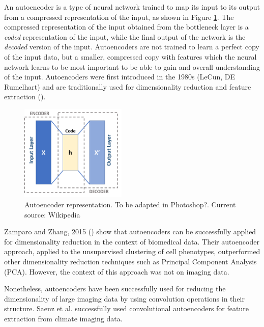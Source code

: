 An autoencoder is a type of neural network trained to map its input to its output from a compressed representation of the input, as shown in Figure \ref{fig:autoencoder}. The compressed representation of the input obtained from the bottleneck layer is a \textit{coded} representation of the input, while the final output of the network is the \textit{decoded} version of the input. Autoencoders are not trained to learn a perfect copy of the input data, but a smaller, compressed copy with features which the neural network learns to be most important to be able to gain and overall understanding of the input. Autoencoders were first introduced in the 1980s (LeCun, DE Rumelhart) and are traditionally used for dimensionality reduction and feature extraction (\cite{http://www.deeplearningbook.org/contents/autoencoders.html}).

\begin{figure}[h!]
    \centering
    \includegraphics[width=0.45\textwidth]{dissertation/figures/autoencoder_schema.png}
    \caption{Autoencoder representation. To be adapted in Photoshop?. Current source: Wikipedia}
    \label{fig:autoencoder}
\end{figure}

Zamparo and Zhang, 2015 (\cite{https://arxiv.org/pdf/1501.01348.pdf}) show that autoencoders can be successfully applied for dimensionality reduction in the context of biomedical data. Their autoencoder approach, applied to the unsupervised clustering of cell phenotypes, outperformed other dimensionality reduction techniques such as Principal Component Analysis (PCA). However, the context of this approach was not on imaging data.

Nonetheless, autoencoders have been successfully used for reducing the dimensionality of large imaging data by using convolution operations in their structure. Saenz et al. successfully used convolutional autoencoders for feature extraction from climate imaging data. %


